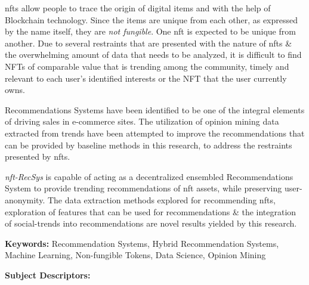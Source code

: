 
\gls{nft}s allow people to trace the origin of digital items and with the help of Blockchain technology. Since the items are unique from each other, as expressed by the name itself, they are \textit{not fungible}. One \gls{nft} is expected to be unique from another. 
Due to several restraints that are presented with the nature of \gls{nft}s \& the overwhelming amount of data that needs to be analyzed, it is difficult to find NFTs of comparable value that is trending among the community, timely and relevant to each user’s identified interests or the NFT that the user currently owns.

Recommendations Systems have been identified to be one of the integral elements of driving sales in e-commerce sites. The utilization of opinion mining data extracted from trends have been attempted to improve the recommendations that can be provided by baseline methods in this research, to address the restraints presented by \gls{nft}s.

\textit{\gls{nft}-RecSys} is capable of acting as a decentralized ensembled Recommendations System to provide trending recommendations of \gls{nft} assets, while preserving user-anonymity. The data extraction methods explored for recommending \gls{nft}s, exploration of features that can be used for recommendations \& the integration of social-trends into recommendations are novel results yielded by this research.

\bigbreak
\noindent\textbf{Keywords:} Recommendation Systems, Hybrid Recommendation Systems, Machine Learning, Non-fungible Tokens, Data Science, Opinion Mining

\bigbreak
\noindent\textbf{Subject Descriptors:}

